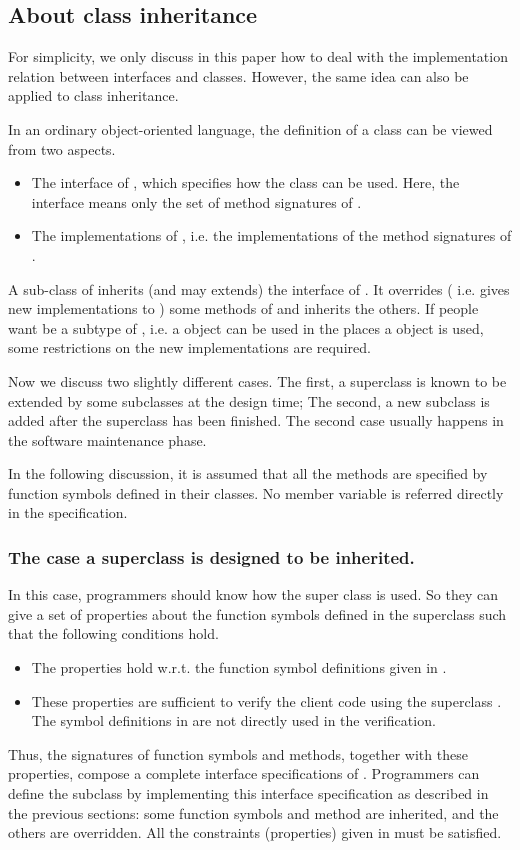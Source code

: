 \documentclass[fleqn]{llncs}
\begin{document}
\subsection{About class inheritance}
For simplicity, we only discuss  in this paper how to deal with the implementation relation between interfaces and classes.
However, the same idea can also be applied to class inheritance.

In an ordinary object-oriented language, the definition of a class  can be viewed from two aspects.
\begin{itemize}
\item The interface of , which specifies how the class can be used. Here, the interface means only the set of method signatures of .
\item The implementations of , i.e. the implementations of the method signatures of .
\end{itemize}
A sub-class  of  inherits (and may extends) the interface of . It overrides ( i.e. gives new implementations to )
some methods of  and inherits the others. If people want  be a subtype of , i.e.
a  object can be used in the places a  object is used, some restrictions on the new implementations are required.

Now we discuss two slightly different cases. The first, a superclass is known to be extended by some subclasses at the design time;
The second, a new subclass is added after the superclass has been finished. The second case usually happens in the software maintenance phase.

In the following discussion, it is assumed that all the methods are specified by function symbols defined
in their classes. No member variable is referred directly in the specification.
\subsubsection{The case a superclass is designed to be inherited.} In this case, programmers should know how the super class is used. So they can give
a set of properties about the function symbols defined in the superclass  such that the following conditions hold.
\begin{itemize}
\item The properties hold w.r.t. the function symbol definitions given in .
\item These properties are sufficient to verify the client code using the superclass . The symbol
definitions in  are not directly used in the verification.
\end{itemize}
Thus, the signatures of function symbols and methods, together with these properties, compose a complete interface specifications of .
Programmers can define the subclass  by implementing this interface specification as described in the previous sections: some function symbols
and method are inherited, and the others are overridden. All the constraints (properties) given in  must be satisfied.
\end{document}
